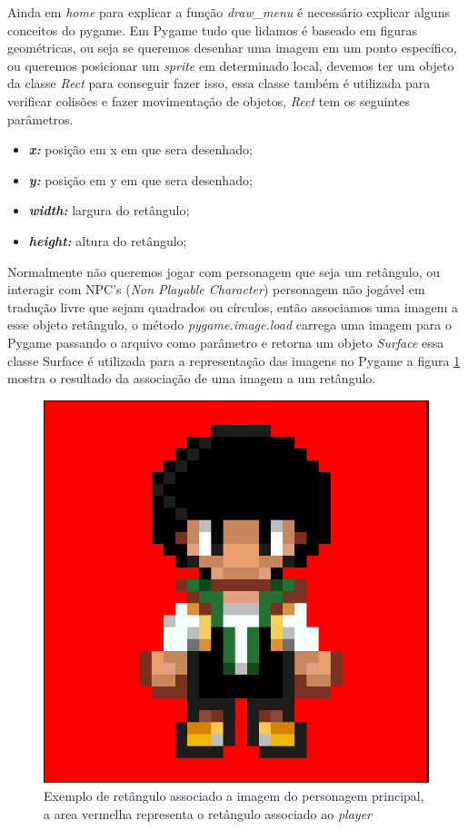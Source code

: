 Ainda em \textit{home} para explicar a função \textit{draw\_menu} é necessário explicar alguns conceitos do pygame. Em Pygame tudo que lidamos é baseado em figuras geométricas, ou seja se queremos desenhar uma imagem em um ponto específico, ou queremos posicionar um \textit{sprite} em determinado local, devemos ter um objeto da classe \textit{Rect} para conseguir fazer isso, essa classe também é utilizada para verificar colisões e fazer movimentação de objetos, \textit{Rect} tem os seguintes parâmetros.
\begin{itemize}
    \item \textit{\textbf{x:}} posição em x em que sera desenhado;
    \item \textit{\textbf{y:}} posição em y em que sera desenhado;
    \item \textit{\textbf{width:}} largura do retângulo;
    \item \textit{\textbf{height:}} altura do retângulo;
\end{itemize}

Normalmente não queremos jogar com personagem que seja um retângulo, ou interagir com NPC's (\textit{Non Playable Character}) personagem não jogável em tradução livre que sejam quadrados ou círculos, então associamos uma imagem a esse objeto retângulo, o método \textit{pygame.image.load} carrega uma imagem para o Pygame passando o arquivo como parâmetro e retorna um objeto \textit{Surface} essa classe Surface é utilizada para a representação das imagens no Pygame a figura \ref{fig:player} mostra o resultado da associação de uma imagem a um retângulo.
\begin{figure}[h!]
    \centering
    \includegraphics[width=0.5\linewidth]{figuras/player.png}
    \caption{Exemplo de retângulo associado a imagem do personagem principal, a area vermelha representa o retângulo associado ao \textit{player}}
    \label{fig:player}
\end{figure}

